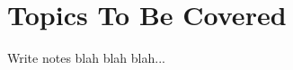 \documentclass[12pt]{article}
\begin{document}
\maketitle
\section{Topics To Be Covered}
Write notes blah blah blah...
\end{document}
